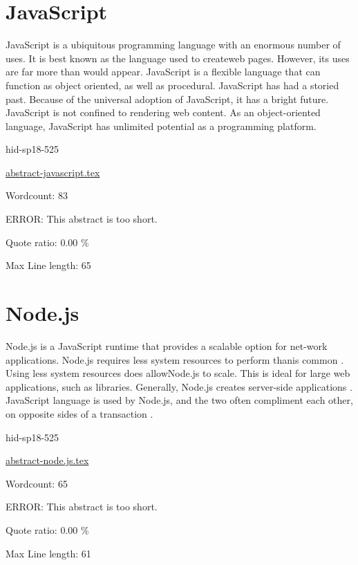 \section{JavaScript}


JavaScript is a ubiquitous programming language with an
enormous number of uses. It is best known as the language
used to createweb pages\cite{hid-sp18-525-java}. However, its 
uses are far more than would appear. JavaScript is a flexible 
language that can function as object oriented, as well as 
procedural\cite{hid-sp18-525-java}. JavaScript has had a storied 
past\cite{hid-sp18-525-java}. Because of the universal adoption 
of JavaScript, it has a bright future. JavaScript is not 
confined to rendering web content. As an object-oriented 
language, JavaScript has unlimited potential as a 
programming platform\cite{hid-sp18-525-java}.


\begin{IU}

hid-sp18-525

\href{https://github.com/cloudmesh-community/hid-sp18-525/blob/master//technology/abstract-javascript.tex}{abstract-javascript.tex}

 

Wordcount: 83

ERROR: This abstract is too short.


Quote ratio: 0.00 \%
 
Max Line length: 65
\end{IU}

\section{Node.js}


Node.js is a JavaScript runtime that provides a scalable 
option for net-work applications. Node.js requires less 
system resources to perform thanis common
\cite{hid-sp18-525-nodejs}. Using less system resources does 
allowNode.js to scale. This is ideal for large web 
applications, such as libraries\cite{hid-sp18-525-nodejs}. 
Generally, Node.js creates server-side applications 
\cite{hid-sp18-525-nodejs}. JavaScript language is used by 
Node.js, and the two often compliment each
other, on opposite sides of a transaction 
\cite{hid-sp18-525-nodejs}.


\begin{IU}

hid-sp18-525

\href{https://github.com/cloudmesh-community/hid-sp18-525/blob/master//technology/abstract-node.js.tex}{abstract-node.js.tex}

 

Wordcount: 65

ERROR: This abstract is too short.


Quote ratio: 0.00 \%
 
Max Line length: 61
\end{IU}

